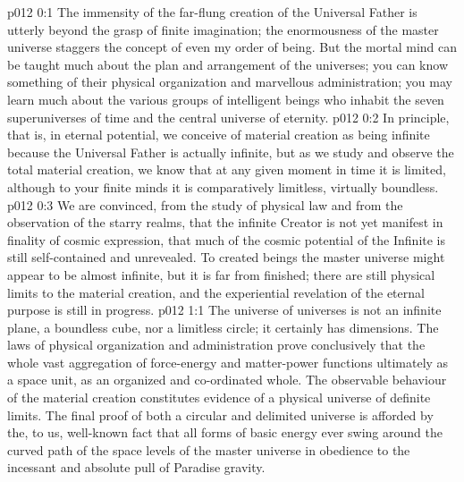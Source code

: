 \author{Perfector of Wisdom}
\vs p012 0:1 The immensity of the far\hyp{}flung creation of the Universal Father is utterly beyond the grasp of finite imagination; the enormousness of the master universe staggers the concept of even my order of being. But the mortal mind can be taught much about the plan and arrangement of the universes; you can know something of their physical organization and marvellous administration; you may learn much about the various groups of intelligent beings who inhabit the seven superuniverses of time and the central universe of eternity.
\vs p012 0:2 In principle, that is, in eternal potential, we conceive of material creation as being infinite because the Universal Father is actually infinite, but as we study and observe the total material creation, we know that at any given moment in time it is limited, although to your finite minds it is comparatively limitless, virtually boundless.
\vs p012 0:3 We are convinced, from the study of physical law and from the observation of the starry realms, that the infinite Creator is not yet manifest in finality of cosmic expression, that much of the cosmic potential of the Infinite is still self\hyp{}contained and unrevealed. To created beings the master universe might appear to be almost infinite, but it is far from finished; there are still physical limits to the material creation, and the experiential revelation of the eternal purpose is still in progress.
\vs p012 1:1 The universe of universes is not an infinite plane, a boundless cube, nor a limitless circle; it certainly has dimensions. The laws of physical organization and administration prove conclusively that the whole vast aggregation of force\hyp{}energy and matter\hyp{}power functions ultimately as a space unit, as an organized and co\hyp{}ordinated whole. The observable behaviour of the material creation constitutes evidence of a physical universe of definite limits. The final proof of both a circular and delimited universe is afforded by the, to us, well\hyp{}known fact that all forms of basic energy ever swing around the curved path of the space levels of the master universe in obedience to the incessant and absolute pull of Paradise gravity.
